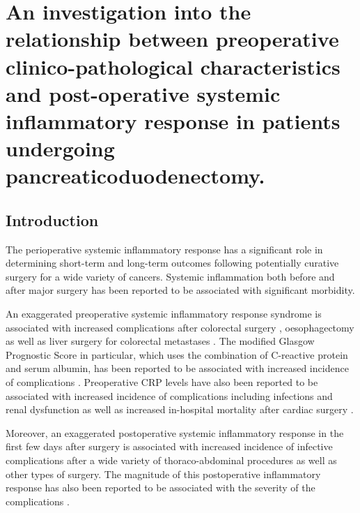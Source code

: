 \chapter{An investigation into the relationship between preoperative clinico-pathological characteristics and post-operative systemic inflammatory response in patients undergoing pancreaticoduodenectomy.}
\label{ch_bodycomp}


\clearpage

\section{Introduction}
The perioperative systemic inflammatory response has a significant role in determining short-term and long-term outcomes following potentially curative surgery for a wide variety of cancers. Systemic inflammation both before and after major surgery has been reported to be associated with significant morbidity. 

An exaggerated preoperative systemic inflammatory response syndrome is associated with increased complications after colorectal surgery \parencite{moyes_preoperative_2009, kubo_elevated_2013}, oesophagectomy \parencite{vashist_glasgow_2010} as well as liver surgery for colorectal metastases \parencite{neal_preoperative_2011}. 
The modified Glasgow Prognostic Score in particular, which uses the combination of C-reactive protein and serum albumin, has been reported to be associated with increased incidence of complications \parencite{moyes_preoperative_2009, mohri_correlation_2014, vashist_glasgow_2010}.
Preoperative CRP levels have also been reported to be associated with increased incidence of complications including infections and renal dysfunction as well as increased in-hospital mortality after cardiac surgery \parencite{lorenzo_increased_2012, mezzomo_preoperative_2011, kim_predictive_2009, biancari_preoperative_2003, boeken_increased_1998}.

Moreover, an exaggerated postoperative systemic inflammatory response in the first few days after surgery is associated with increased incidence of infective complications after a wide variety of thoraco-abdominal procedures\parencite{platt_c-reactive_2012, dutta_persistent_2011, welsch_persisting_2008} as well as other types of surgery\parencite{mcneer_early_2010, laporta_baez_c-reactive_2011}.
The magnitude of this postoperative inflammatory response has also been reported to be associated with the severity of the complications \parencite{mcsorley_postoperative_2015}. 


